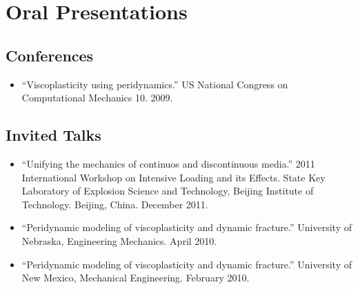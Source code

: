 \section*{Oral Presentations}

\subsection*{Conferences}

\begin{itemize}
    \item ``Viscoplasticity using peridynamics.''   US National Congress on Computational Mechanics 10. 2009.
\end{itemize}

\subsection*{Invited Talks}

\begin{itemize}
    \item ``Unifying the mechanics of continuos and discontinuous media.''  2011 International Workshop on Intensive Loading and its Effects.  State Key Laboratory of Explosion Science and Technology, Beijing Institute of Technology.  Beijing, China. December 2011.

    \item ``Peridynamic modeling of viscoplasticity and dynamic fracture.''  University of Nebraska, Engineering Mechanics. April 2010.

    \item ``Peridynamic modeling of viscoplasticity and dynamic fracture.''  University of New Mexico, Mechanical Engineering. February 2010.
\end{itemize}

